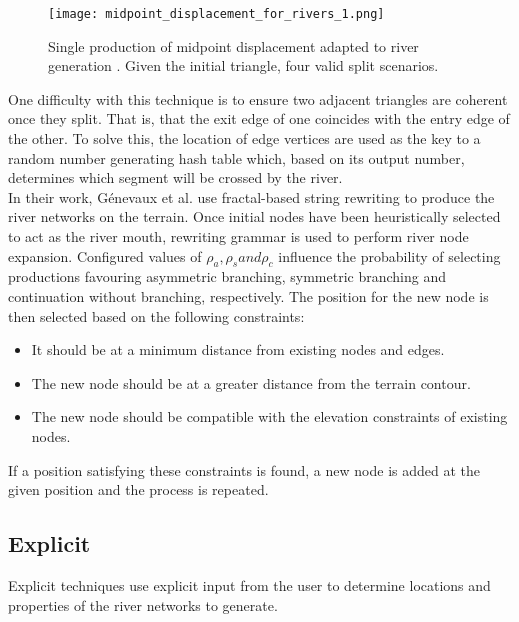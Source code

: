 \begin{figure}[h]
  \centering
	\label{Single production of midpoint displacement adapted to river generation. Given the initial triangle, four valid split scenarios. }
	\texttt{[image: midpoint\_displacement\_for\_rivers\_1.png]}
	\caption{Single production of midpoint displacement adapted to river generation \cite{Prusinkiewicz1993}. Given the initial triangle, four valid split scenarios.}
\end{figure}

One difficulty with this technique is to ensure two adjacent triangles are coherent once they split. That is, that the exit edge of one coincides with the entry edge of the other. To solve this, the location of edge vertices are used as the key to a random number generating hash table which, based on its output number, determines which segment will be crossed by the river.  \\

In their work, Génevaux et al. \cite{Genevaux2013} use fractal-based string rewriting to produce the river networks on the terrain. Once initial nodes have been heuristically selected to act as the river mouth, rewriting grammar is used to perform river node expansion. Configured values of $\rho_{a}, \rho_{s} and \rho_{c}$ influence the probability of selecting productions favouring asymmetric branching, symmetric branching and continuation without branching, respectively. The position for the new node is then selected based on the following constraints:
\begin{itemize}
\item It should be at a minimum distance from existing nodes and edges.
\item The new node should be at a greater distance from the terrain contour.
\item The new node should be compatible with the elevation constraints of existing nodes.
\end{itemize}
If a position satisfying these constraints is found, a new node is added at the given position and the process is repeated.\\

\subsection{Explicit}

Explicit techniques use explicit input from the user to determine locations and properties of the river networks to generate.\\

